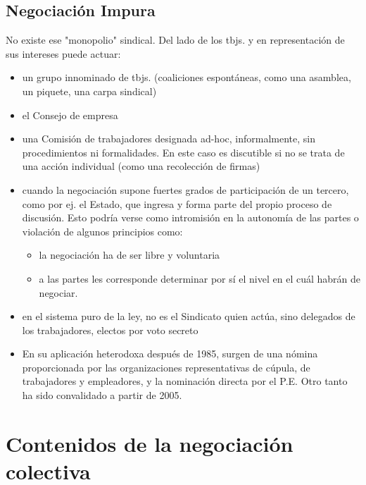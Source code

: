 \documentclass[spanish,12pt,a4paper,titlepage]{report}
\begin{document}
\subsection*{Negociación Impura}
No existe ese "monopolio" sindical. Del lado de los tbjs. y en representación de sus intereses puede actuar:
\begin{itemize}
	\item un grupo innominado de tbjs. (coaliciones espontáneas, como una asamblea, un piquete, una carpa sindical)
	\item el Consejo de empresa
	\item una Comisión de trabajadores designada ad-hoc, informalmente, sin procedimientos ni formalidades. En este caso es discutible si no se trata de una acción individual (como una recolección de firmas)
	\item cuando la negociación supone fuertes grados de participación de un tercero, como por ej. el Estado, que ingresa y forma parte del propio proceso de discusión. Esto podría verse como intromisión en la autonomía de las partes o violación de algunos principios como:
	\begin{itemize}
		\item la negociación ha de ser libre y voluntaria
		\item a las partes les corresponde determinar por sí el nivel en el cuál habrán de negociar.
	\end{itemize}
	\item en el sistema puro de la ley, no es el Sindicato quien actúa, sino delegados de los trabajadores, electos por voto secreto
	\item En su aplicación heterodoxa después de 1985, surgen de una nómina proporcionada por las organizaciones representativas de cúpula, de trabajadores y empleadores, y la nominación directa por el P.E. Otro tanto ha sido convalidado a partir de 2005.
\end{itemize}

\section{Contenidos de la negociación colectiva}
\end{document}
